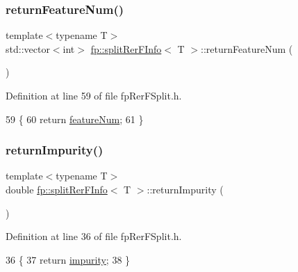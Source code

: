 \subsubsection{\texorpdfstring{return\+Feature\+Num()}{returnFeatureNum()}}
{\footnotesize\ttfamily template$<$typename T$>$ \\
std\+::vector$<$int$>$ \hyperlink{classfp_1_1splitRerFInfo}{fp\+::split\+Rer\+F\+Info}$<$ T $>$\+::return\+Feature\+Num (\begin{DoxyParamCaption}{ }\end{DoxyParamCaption})\hspace{0.3cm}{\ttfamily [inline]}}



Definition at line 59 of file fp\+Rer\+F\+Split.\+h.


\begin{DoxyCode}
59                                                         \{
60                     \textcolor{keywordflow}{return} \hyperlink{classfp_1_1splitRerFInfo_aad977b73aea39d978ae0f04c3d8bf6ef}{featureNum};
61                 \}
\end{DoxyCode}
\mbox{\label{classfp_1_1splitRerFInfo_a79dc984d11d69e61abc7f546e9effd90}} 
\subsubsection{\texorpdfstring{return\+Impurity()}{returnImpurity()}}
{\footnotesize\ttfamily template$<$typename T$>$ \\
double \hyperlink{classfp_1_1splitRerFInfo}{fp\+::split\+Rer\+F\+Info}$<$ T $>$\+::return\+Impurity (\begin{DoxyParamCaption}{ }\end{DoxyParamCaption})\hspace{0.3cm}{\ttfamily [inline]}}



Definition at line 36 of file fp\+Rer\+F\+Split.\+h.


\begin{DoxyCode}
36                                               \{
37                     \textcolor{keywordflow}{return} \hyperlink{classfp_1_1splitRerFInfo_a37516896816870be54ff20a713dc4bd3}{impurity};
38                 \}
\end{DoxyCode}
\mbox{\label{classfp_1_1splitRerFInfo_a744a6c0b2f76ce9b74f35a59642b9837}} 
